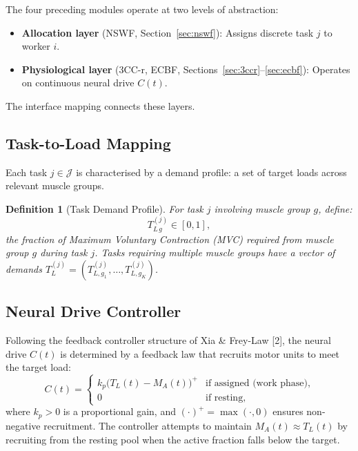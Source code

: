 \documentclass[11pt,a4paper]{article}
\newtheorem{definition}[theorem]{Definition}
\begin{document}
The four preceding modules operate at two levels of abstraction:
\begin{itemize}[noitemsep]
\item \textbf{Allocation layer} (NSWF, Section~\ref{sec:nswf}): Assigns discrete task $j$ to worker $i$.
\item \textbf{Physiological layer} (3CC-r, ECBF, Sections~\ref{sec:3ccr}--\ref{sec:ecbf}): Operates on continuous neural drive $C(t)$.
\end{itemize}
The interface mapping connects these layers.

\subsection{Task-to-Load Mapping}

Each task $j \in \mathcal{J}$ is characterised by a demand profile: a
set of target loads across relevant muscle groups.

\begin{definition}[Task Demand Profile]
For task $j$ involving muscle group $g$, define:
\begin{equation}
T^{(j)}_{L\,g} \in [0, 1],
\end{equation}
the fraction of Maximum Voluntary Contraction (MVC) required from
muscle group $g$ during task $j$. Tasks requiring multiple muscle
groups have a vector of demands $T_L^{(j)} = (T^{(j)}_{L,g_1}, \ldots,
T^{(j)}_{L,g_K})$.
\end{definition}

\subsection{Neural Drive Controller}

Following the feedback controller structure of Xia \& Frey-Law [2],
the neural drive $C(t)$ is determined by a feedback law that recruits
motor units to meet the target load:
\begin{equation}\label{eq:controller}
C(t) =
\begin{cases}
k_p \bigl(T_L(t) - M_A(t)\bigr)^+ & \text{if assigned (work phase)}, \\
0 & \text{if resting},
\end{cases}
\end{equation}
where $k_p > 0$ is a proportional gain, and $(\cdot)^+ = \max(\cdot,
0)$ ensures non-negative recruitment. The controller attempts to
maintain $M_A(t) \approx T_L(t)$ by recruiting from the resting pool
when the active fraction falls below the target.
\end{document}
